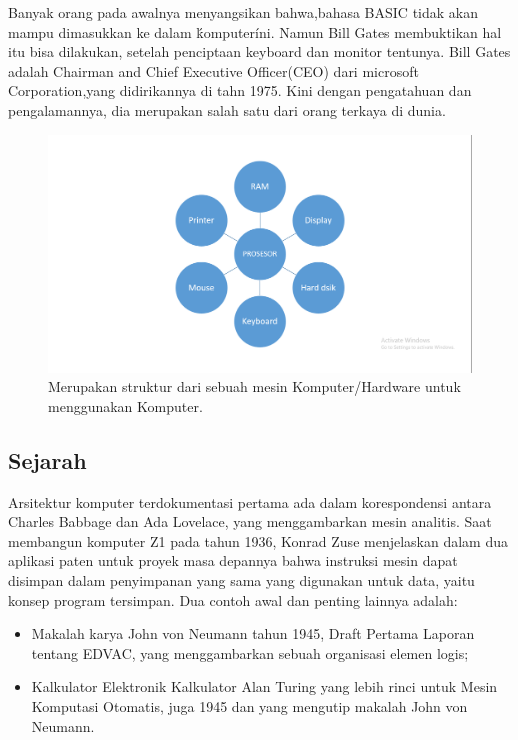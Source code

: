 	Banyak orang pada awalnya menyangsikan bahwa,bahasa BASIC tidak akan mampu dimasukkan ke dalam \'komputer\' ini. 
	Namun Bill Gates membuktikan hal itu bisa dilakukan, setelah penciptaan keyboard dan monitor tentunya. 
	Bill Gates adalah Chairman and Chief Executive Officer(CEO) dari microsoft Corporation,yang didirikannya di tahn 1975.
	Kini dengan pengatahuan dan pengalamannya, dia merupakan salah satu dari orang terkaya di dunia.\cite{syafrizal2005pengantar}
	\begin{figure}[ht]
		\centerline{\includegraphics[width=1\textwidth]{figures/komputermodern.PNG}}
		\caption{Merupakan struktur dari sebuah mesin Komputer/Hardware untuk menggunakan Komputer.}
		\label{komputermodern}
	\end{figure}
	
	\subsection{Sejarah}
Arsitektur komputer terdokumentasi pertama ada dalam korespondensi antara Charles Babbage dan Ada Lovelace, yang menggambarkan mesin analitis. Saat membangun komputer Z1 pada tahun 1936, Konrad Zuse menjelaskan dalam dua aplikasi paten untuk proyek masa depannya bahwa instruksi mesin dapat disimpan dalam penyimpanan yang sama yang digunakan untuk data, yaitu konsep program tersimpan. \cite{faberkonrad} Dua contoh awal dan penting lainnya adalah:
\begin{itemize}
\item Makalah karya John von Neumann tahun 1945, Draft Pertama Laporan tentang EDVAC, yang menggambarkan sebuah organisasi elemen logis; \cite{von1945first}
\item Kalkulator Elektronik Kalkulator Alan Turing yang lebih rinci untuk Mesin Komputasi Otomatis, juga 1945 dan yang mengutip makalah John von Neumann. \cite{copeland2005alan}
\end{itemize}

